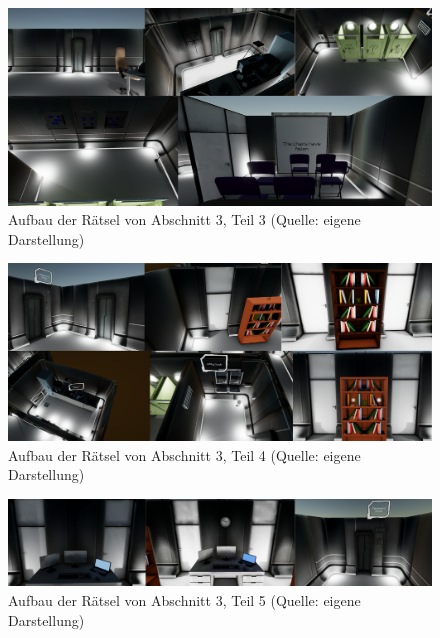 \begin{figure}[ht]
\centering
\includegraphics[width=1\linewidth]{content/pictures/Rätseldesign - Abschnitt02 - Rätsel02.png}
\caption{Aufbau der Rätsel von Abschnitt 3, Teil 3 (Quelle: eigene Darstellung)}
\label{fig:riddle-design-section02-02}
\end{figure}

\begin{figure}[ht]
\centering
\includegraphics[width=1\linewidth]{content/pictures/Rätseldesign - Abschnitt02 - Rätsel03.png}
\caption{Aufbau der Rätsel von Abschnitt 3, Teil 4 (Quelle: eigene Darstellung)}
\label{fig:riddle-design-section02-03}
\end{figure}

\begin{figure}[ht]
\centering
\includegraphics[width=1\linewidth]{content/pictures/Rätseldesign - Abschnitt02 - Rätsel04.png}
\caption{Aufbau der Rätsel von Abschnitt 3, Teil 5 (Quelle: eigene Darstellung)}
\label{fig:riddle-design-section02-04}
\end{figure}

